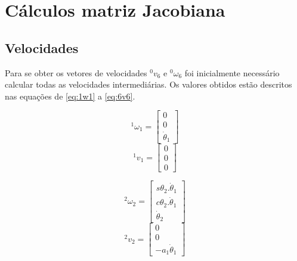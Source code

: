 
\chapter{Cálculos matriz Jacobiana}
\label{AnexoJacobiana}

\section{Velocidades}
\label{AnexoJacobiana-velocidades}

Para se obter os vetores de velocidades $^0v_6$ e $^0\omega_6$ foi inicialmente necessário 
calcular todas as velocidades intermediárias. Os valores obtidos estão descritos nas equações
de \ref{eq:1w1} a \ref{eq:6v6}.

\begin{multicols}{2}
    \noindent
    \begin{equation}
        \label{eq:1w1}
        ^1\omega_1 =    \begin{bmatrix}
                            0 \\ 0 \\ \dot{\theta}_1
                        \end{bmatrix}
    \end{equation}
    \begin{equation}
        ^1v_1 =     \begin{bmatrix}
                        0 \\ 0 \\ 0
                    \end{bmatrix}
    \end{equation}
\end{multicols}

\begin{multicols}{2}
    \noindent
    \begin{equation}
        ^2\omega_2 =    \begin{bmatrix}
                            s\theta_2.\dot{\theta}_1 \\ c\theta_2.\dot{\theta}_1 \\ \dot{\theta}_2
                        \end{bmatrix}
    \end{equation}
    \begin{equation}
        ^2v_2 = \begin{bmatrix}
                    0 \\ 0 \\ -a_1\dot{\theta}_1
                \end{bmatrix}
    \end{equation}
\end{multicols}

